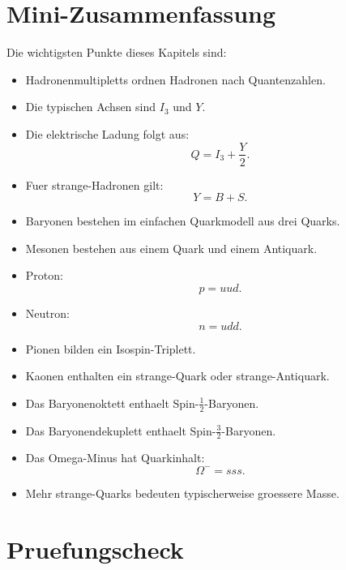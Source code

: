 \section{Mini-Zusammenfassung}

\begin{notebox}
Die wichtigsten Punkte dieses Kapitels sind:
\begin{itemize}
    \item Hadronenmultipletts ordnen Hadronen nach Quantenzahlen.
    \item Die typischen Achsen sind $I_3$ und $Y$.
    \item Die elektrische Ladung folgt aus:
    \[
        Q=I_3+\frac{Y}{2}.
    \]
    \item Fuer strange-Hadronen gilt:
    \[
        Y=B+S.
    \]
    \item Baryonen bestehen im einfachen Quarkmodell aus drei Quarks.
    \item Mesonen bestehen aus einem Quark und einem Antiquark.
    \item Proton:
    \[
        p=uud.
    \]
    \item Neutron:
    \[
        n=udd.
    \]
    \item Pionen bilden ein Isospin-Triplett.
    \item Kaonen enthalten ein strange-Quark oder strange-Antiquark.
    \item Das Baryonenoktett enthaelt Spin-$\frac{1}{2}$-Baryonen.
    \item Das Baryonendekuplett enthaelt Spin-$\frac{3}{2}$-Baryonen.
    \item Das Omega-Minus hat Quarkinhalt:
    \[
        \Omega^- = sss.
    \]
    \item Mehr strange-Quarks bedeuten typischerweise groessere Masse.
\end{itemize}
\end{notebox}

\section{Pruefungscheck}

